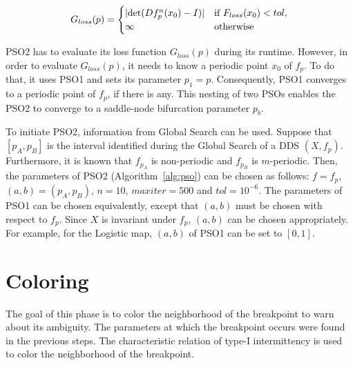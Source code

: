 \begin{equation}
\label{eq:minimize_p}
    G_{loss}(p) =
    \begin{cases}
        |\text{det}(Df^{n}_{p}(x_0)-I)| & \text{if } F_{loss}(x_0) < tol, \\
        \infty & \rm{otherwise}
    \end{cases}
\end{equation}

PSO2 has to evaluate its loss function $G_{loss}(p)$ during its runtime.
However, in order to evaluate $G_{loss}(p)$, it needs to know a periodic point $x_0$ of $f_{p}$.
To do that, it uses PSO1 and sets its parameter $p_{1} = p$.
Consequently, PSO1 converges to a periodic point of $f_{p}$, if there is any.
This nesting of two PSOs enables the PSO2 to converge to a saddle-node bifurcation parameter $p_{b}$.
\par
To initiate PSO2, information from Global Search can be used.
Suppose that $[p_{A}, p_{B}]$ is the interval identified during the Global Search of a DDS $(X, f_{p})$.
Furthermore, it is known that $f_{p_{A}}$ is non-periodic and $f_{p_{B}}$ is $m$-periodic.
Then, the parameters of PSO2 (Algorithm~\ref{alg:pso}) can be chosen as follows: $f = f_{p}$, $(a, b) = (p_{A}, p_{B})$, $n = 10$, $maxiter = 500$ and $tol = 10^{-6}$.
The parameters of PSO1 can be chosen equivalently, except that $(a, b)$ must be chosen with respect to $f_{p}$.
Since $X$ is invariant under $f_{p}$, $(a, b)$ can be chosen appropriately.
For example, for the Logistic map, $(a, b)$ of PSO1 can be set to $[0, 1]$.

\section{Coloring}
The goal of this phase is to color the neighborhood of the breakpoint to warn about its ambiguity.
The parameters at which the breakpoint occurs were found in the previous steps.
The characteristic relation of type-I intermittency is used to color the neighborhood of the breakpoint.

